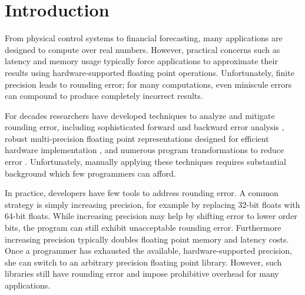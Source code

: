 \documentclass[paper.tex]{subfiles}
\begin{document}
\section{Introduction}
\label{sec:intro}

From physical control systems to financial forecasting, many
applications are designed to compute over real numbers.  However,
practical concerns such as latency and memory usage typically force
applications to approximate their results using hardware-supported
floating point operations.  Unfortunately, finite precision leads to
rounding error; for many computations, even miniscule errors can
compound to produce completely incorrect results.


For decades researchers have developed techniques to analyze and
mitigate rounding error, including sophisticated forward and backward
error analysis , robust multi-precision floating point
representations designed for efficient hardware implementation
, and numerous program transformations to reduce error
.  Unfortunately, manually applying these techniques
requires substantial background which few programmers can afford.

In practice, developers have few tools to address rounding error.  A
common strategy is simply increasing precision, for example by
replacing 32-bit floats with 64-bit floats.  While increasing
precision may help by shifting error to lower order bits, the program
can still exhibit unacceptable rounding error.  Furthermore increasing
precision typically doubles floating point memory and latency costs.
Once a programmer has exhausted the available, hardware-supported
precision, she can switch to an arbitrary precision floating point
library.  However, such libraries still have rounding error and impose
prohibitive overhead for many applications.  

\end{document}

